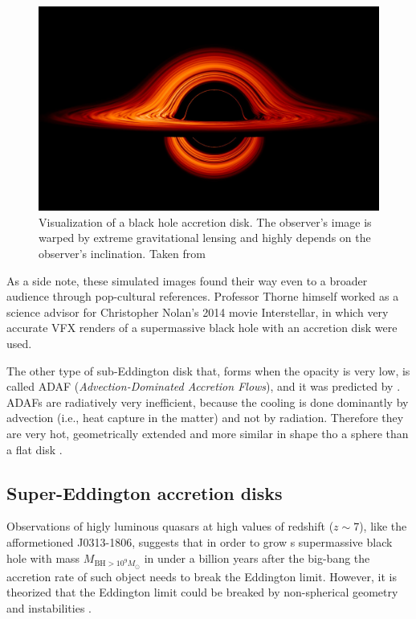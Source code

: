     \begin{figure}[h]
        \centering
        \includegraphics[width=1.0\columnwidth]{img/bh_warped.jpg}
        \caption{Visualization of a black hole accretion disk. The observer's image is warped by extreme gravitational lensing and highly depends on the observer's inclination. Taken from \citep{nasa_img_bh_warped}}
        \label{fig:bh_warped}
    \end{figure}

    As a side note, these simulated images found their way even to a broader audience through pop-cultural references. Professor Thorne himself worked as a science advisor for Christopher Nolan's 2014 movie Interstellar, in which very accurate VFX renders of a supermassive black hole with an accretion disk were used. 

    The other type of sub-Eddington disk that, forms when the opacity is very low, is called ADAF (\emph{Advection-Dominated Accretion Flows}), and it was predicted by \citep{ichimaru1977}. ADAFs are radiatively very inefficient, because the cooling is done dominantly by advection (i.e., heat capture in the matter) and not by radiation. Therefore they are very hot, geometrically extended and more similar in shape tho a sphere than a flat disk \citep{acpow}.

\subsection{Super-Eddington accretion disks}
    Observations of higly luminous quasars at high values of redshift ($z \sim 7$), like the afformetioned J0313-1806, suggests that in order to grow s supermassive black hole with mass $M_{\mathrm{BH} > 10^9 M_{\odot}}$ in under a billion years after the big-bang the accretion rate of such object needs to break the Eddington limit. However, it is theorized that the Eddington limit could be breaked by non-spherical geometry and instabilities \citep{brightman2019}.

